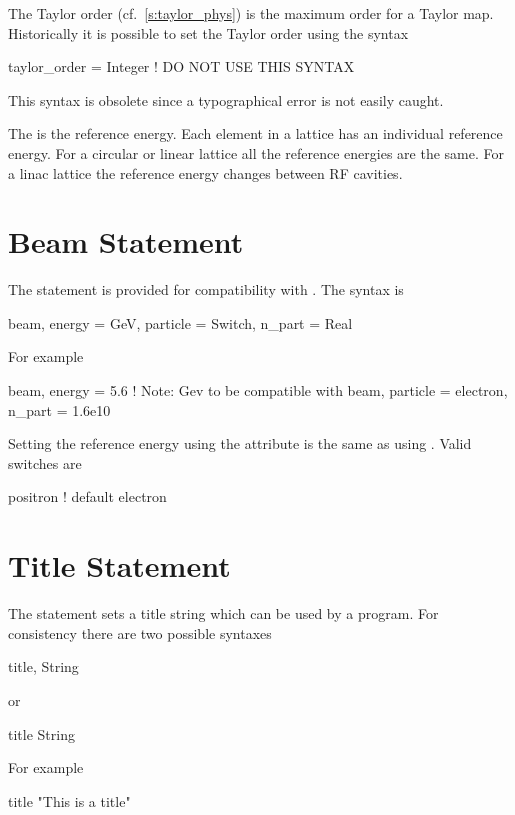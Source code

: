 The Taylor order (cf.~\ref{s:taylor_phys}) is the maximum order for a
Taylor map.  Historically it is possible to set the Taylor order using
the syntax
\begin{example}
  taylor_order = Integer   ! DO NOT USE THIS SYNTAX
\end{example}
This syntax is obsolete since a typographical error is not easily caught.

The  is the reference energy.  Each element in a lattice 
has an individual reference energy. For a circular or linear lattice all 
the reference energies are the same. For a linac lattice
the reference energy changes between RF cavities.


\section{Beam Statement}

The  statement is provided for compatibility with \mad. The syntax is
\begin{example}
  beam, energy = GeV, particle = Switch, n_part = Real
\end{example}
For example
\begin{example}
  beam, energy = 5.6  ! Note: Gev to be compatible with \mad
  beam, particle = electron, n_part = 1.6e10
\end{example}
Setting the reference energy using the  attribute is the same
as using . Valid 
switches are
\begin{example}
  positron  ! default
  electron
\end{example}

\section{Title Statement}
The  statement sets a title string which can be used by a program. 
For consistency there are two possible syntaxes
\begin{example}
  title, String
\end{example}
or
\begin{example}
  title
  String
\end{example}
For example
\begin{example}
  title
  "This is a title"
\end{example}


